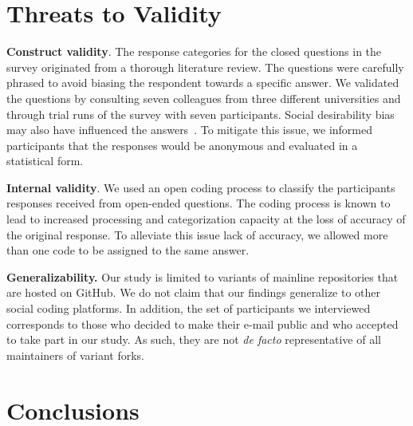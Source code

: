\section{Threats to Validity}

\noindent \textbf{Construct validity}.
The response categories for the closed questions in the survey originated from a thorough literature review.
The questions were carefully phrased to avoid biasing the respondent towards a specific answer. We validated the questions by consulting seven colleagues from three different universities and through trial runs of the survey with seven participants.
Social desirability bias may also have influenced the answers~\cite{Furnham:1986}. To mitigate this issue, we informed participants that the responses would be anonymous and evaluated in a statistical form.

\noindent \textbf{Internal validity}. We used an open coding process to classify the participants responses received from open-ended questions. The coding process is known to lead to increased processing and categorization capacity at the loss of accuracy of the original response. To alleviate this issue lack of accuracy, we allowed more than one code to be assigned to the same answer.

\noindent \textbf{Generalizability.} Our study is limited to variants of mainline repositories that are hosted on GitHub. We do not claim that our findings generalize to other social coding platforms.
In addition, the set of participants we interviewed corresponds to those who decided to make their e-mail public and who accepted to take part in our study. As such, they are not {\em de facto} representative of all maintainers of variant forks.
\section{Conclusions}


